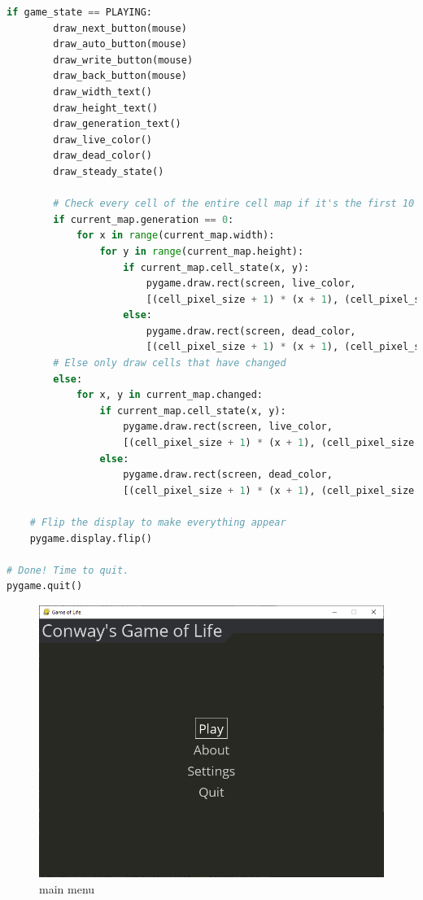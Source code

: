 \documentclass[12pt]{report}
\begin{document}
\begin{lstlisting}[language=Python, caption=game\_of\_life.py]
    if game_state == PLAYING:
        draw_next_button(mouse)
        draw_auto_button(mouse)
        draw_write_button(mouse)
        draw_back_button(mouse)
        draw_width_text()
        draw_height_text()
        draw_generation_text()
        draw_live_color()
        draw_dead_color()
        draw_steady_state()

        # Check every cell of the entire cell map if it's the first 10 iterations
        if current_map.generation == 0:
            for x in range(current_map.width):
                for y in range(current_map.height):
                    if current_map.cell_state(x, y):
                        pygame.draw.rect(screen, live_color, 
                        [(cell_pixel_size + 1) * (x + 1), (cell_pixel_size + 1) * (y + 1), cell_pixel_size, cell_pixel_size])
                    else:
                        pygame.draw.rect(screen, dead_color, 
                        [(cell_pixel_size + 1) * (x + 1), (cell_pixel_size + 1) * (y + 1), cell_pixel_size, cell_pixel_size])
        # Else only draw cells that have changed
        else:
            for x, y in current_map.changed:
                if current_map.cell_state(x, y):
                    pygame.draw.rect(screen, live_color, 
                    [(cell_pixel_size + 1) * (x + 1), (cell_pixel_size + 1) * (y + 1), cell_pixel_size, cell_pixel_size])
                else:
                    pygame.draw.rect(screen, dead_color, 
                    [(cell_pixel_size + 1) * (x + 1), (cell_pixel_size + 1) * (y + 1), cell_pixel_size, cell_pixel_size])

    # Flip the display to make everything appear
    pygame.display.flip()

# Done! Time to quit.
pygame.quit()

\end{lstlisting}

\begin{figure}[ht]
    \centering
    \includegraphics[width=\textwidth]{mainmenu}
    \caption{main menu}
\end{figure}
\end{document}
